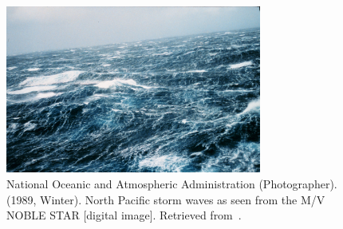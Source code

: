 \begin{figure}
\centering
\includegraphics[width=0.75\textwidth]{figures/wea00816.jpg}
\caption{
	National Oceanic and Atmospheric Administration (Photographer).
	(1989, Winter).
	North Pacific storm waves as seen from the M/V NOBLE STAR [digital image].
	Retrieved from~\citet{misc:noaa:storm}.
	}
\label{fig:ocean:storm}
\end{figure}
